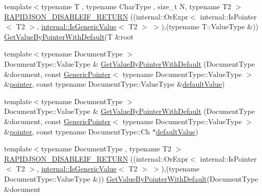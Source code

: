 \begin{DoxyCompactItemize}
\item 
{\footnotesize template$<$typename T , typename Char\+Type , size\+\_\+t N, typename T2 $>$ }\\\mbox{\hyperlink{namespacerapidjson_ac23c133f2ee48521a2754090454de12b}{R\+A\+P\+I\+D\+J\+S\+O\+N\+\_\+\+D\+I\+S\+A\+B\+L\+E\+I\+F\+\_\+\+R\+E\+T\+U\+RN}} ((internal\+::\+Or\+Expr$<$ internal\+::\+Is\+Pointer$<$ T2 $>$, \mbox{\hyperlink{structrapidjson_1_1internal_1_1_is_generic_value}{internal\+::\+Is\+Generic\+Value}}$<$ T2 $>$ $>$),(typename T\+::\+Value\+Type \&)) \mbox{\hyperlink{namespacerapidjson_aa33a1f9cd33ac3f6f2af3f90028fee6e}{Get\+Value\+By\+Pointer\+With\+Default}}(T \&root
\item 
{\footnotesize template$<$typename Document\+Type $>$ }\\Document\+Type\+::\+Value\+Type \& \mbox{\hyperlink{namespacerapidjson_a9e32c018d38a174601d6770be7052f08}{Get\+Value\+By\+Pointer\+With\+Default}} (Document\+Type \&document, const \mbox{\hyperlink{classrapidjson_1_1_generic_pointer}{Generic\+Pointer}}$<$ typename Document\+Type\+::\+Value\+Type $>$ \&\mbox{\hyperlink{namespacerapidjson_aa5b8c07c8721afe6870a0210820ea19d}{pointer}}, const typename Document\+Type\+::\+Value\+Type \&\mbox{\hyperlink{namespacerapidjson_a1591a36fec4c563e57394458a2fc508d}{default\+Value}})
\item 
{\footnotesize template$<$typename Document\+Type $>$ }\\Document\+Type\+::\+Value\+Type \& \mbox{\hyperlink{namespacerapidjson_a77cbd080374924fd75a24cedb2a017b2}{Get\+Value\+By\+Pointer\+With\+Default}} (Document\+Type \&document, const \mbox{\hyperlink{classrapidjson_1_1_generic_pointer}{Generic\+Pointer}}$<$ typename Document\+Type\+::\+Value\+Type $>$ \&\mbox{\hyperlink{namespacerapidjson_aa5b8c07c8721afe6870a0210820ea19d}{pointer}}, const typename Document\+Type\+::\+Ch $\ast$\mbox{\hyperlink{namespacerapidjson_a1591a36fec4c563e57394458a2fc508d}{default\+Value}})
\item 
{\footnotesize template$<$typename Document\+Type , typename T2 $>$ }\\\mbox{\hyperlink{namespacerapidjson_adcea79de1892e918329700f98dfd6ce2}{R\+A\+P\+I\+D\+J\+S\+O\+N\+\_\+\+D\+I\+S\+A\+B\+L\+E\+I\+F\+\_\+\+R\+E\+T\+U\+RN}} ((internal\+::\+Or\+Expr$<$ internal\+::\+Is\+Pointer$<$ T2 $>$, \mbox{\hyperlink{structrapidjson_1_1internal_1_1_is_generic_value}{internal\+::\+Is\+Generic\+Value}}$<$ T2 $>$ $>$),(typename Document\+Type\+::\+Value\+Type \&)) \mbox{\hyperlink{namespacerapidjson_aa33a1f9cd33ac3f6f2af3f90028fee6e}{Get\+Value\+By\+Pointer\+With\+Default}}(Document\+Type \&document

\end{DoxyCompactItemize}
